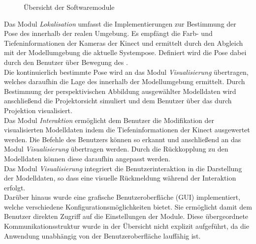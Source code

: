 \begin{figure}[ht]
	\begin{center}%
		\caption{Übersicht der Softwaremodule}
		\label{fig.modules}
	\end{center}
\end{figure}


Das Modul \textit{Lokalisation} umfasst die Implementierungen zur Bestimmung der Pose des  innerhalb der realen Umgebung. Es empfängt die Farb- und Tiefeninformationen der Kameras der Kinect und ermittelt durch den Abgleich mit der Modellumgebung die aktuelle Systempose. Definiert wird die Pose dabei durch den Benutzer über Bewegung des .\\
Die kontinuierlich bestimmte Pose wird an das Modul \textit{Visualisierung} übertragen, welches daraufhin die Lage des  innerhalb der Modellumgebung ermittelt. Durch Bestimmung der perspektivischen Abbildung ausgewählter Modelldaten wird anschließend die Projektorsicht simuliert und dem Benutzer über das \kps{} durch Projektion visualisiert.\\ 

Das Modul \textit{Interaktion} ermöglicht dem Benutzer die Modifikation der visualisierten Modelldaten indem die Tiefeninformationen der Kinect ausgewertet werden. Die Befehle des Benutzers können so erkannt und anschließend an das Modul \textit{Visualisierung} übertragen werden. Durch die Rückkopplung zu den Modelldaten können diese daraufhin angepasst werden.\\
Das Modul \textit{Visualisierung} integriert die Benutzerinteraktion in die Darstellung der Modelldaten, so dass eine visuelle Rückmeldung während der Interaktion erfolgt.\\

Darüber hinaus wurde eine grafische Benutzeroberfläche (GUI) implementiert, welche verschiedene Konfigurationsmöglichkeiten bietet. Sie ermöglicht damit dem Benutzer direkten Zugriff auf die Einstellungen der Module. Diese übergeordnete Kommunikationsstruktur wurde in der Übersicht nicht explizit aufgeführt, da die Anwendung unabhängig von der Benutzeroberfläche lauffähig ist.\\

